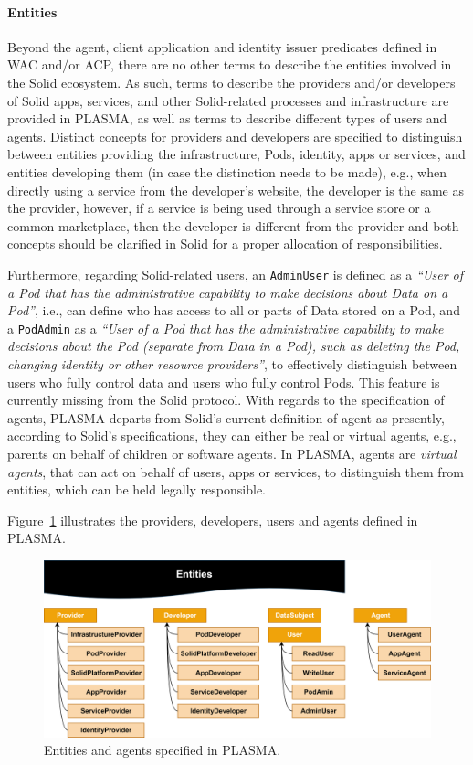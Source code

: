 \paragraph{Entities}
Beyond the agent, client application and identity issuer predicates defined in WAC and/or ACP, there are no other terms to describe the entities involved in the Solid ecosystem.
As such, terms to describe the providers and/or developers of Solid apps, services, and other Solid-related processes and infrastructure are provided in PLASMA, as well as terms to describe different types of users and agents.
Distinct concepts for providers and developers are specified to distinguish between entities providing the infrastructure, Pods, identity, apps or services, and entities developing them (in case the distinction needs to be made), e.g., when directly using a service from the developer's website, the developer is the same as the provider, however, if a service is being used through a service store or a common marketplace, then the developer is different from the provider and both concepts should be clarified in Solid for a proper allocation of responsibilities.

Furthermore, regarding Solid-related users, an \texttt{AdminUser} is defined as a \textit{``User of a Pod that has the administrative capability to make decisions about Data on a Pod''}, i.e., can define who has access to all or parts of Data stored on a Pod, and a \texttt{PodAdmin} as a \textit{``User of a Pod that has the administrative capability to make decisions about the Pod (separate from Data in a Pod), such as deleting the Pod, changing identity or other resource providers''}, to effectively distinguish between users who fully control data and users who fully control Pods. This feature is currently missing from the Solid protocol.
With regards to the specification of agents, PLASMA departs from Solid's current definition of agent as presently, according to Solid's specifications, they can either be real or virtual agents, e.g., parents on behalf of children or software agents.
In PLASMA, agents are \textit{virtual agents}, that can act on behalf of users, apps or services, to distinguish them from entities, which can be held legally responsible.

Figure~\ref{fig:plasma_entities} illustrates the providers, developers, users and agents defined in PLASMA.

\begin{figure}[htbp]
    \centering
    \includegraphics[width=\linewidth]{figures/chapter-4/entities.png}
    \caption{Entities and agents specified in PLASMA.}
    \label{fig:plasma_entities}
\end{figure}

